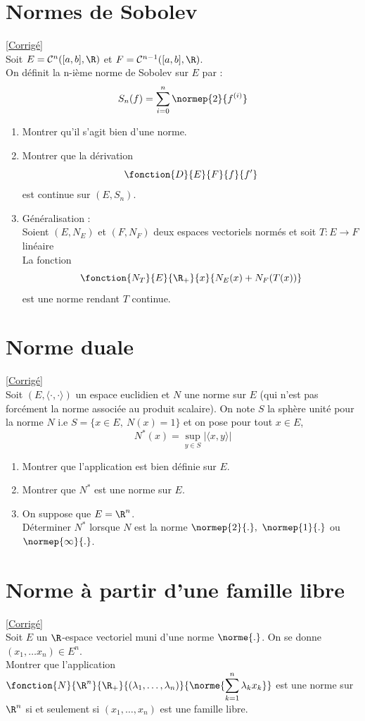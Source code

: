 \documentclass{book}
\begin{document}
	\section{Normes de Sobolev}
	\textcolor{blue}{\hyperref[sec:normes-de-sobolev]{[Corrigé]}}\\
	\label{Normes de Sobolev}
	Soit $E=\mathcal{C}^n([a,b],\R)$ et $F=\mathcal{C}^{n-1}([a,b],\R)$.\\
	On définit la n-ième norme de Sobolev sur $E$ par : \[S_n(f)=\sum_{i=0}^{n}\normep{2}{f^{(i)}}\]
	\begin{enumerate}
		\item Montrer qu'il s'agit bien d'une norme.
		\item Montrer que la dérivation \[\fonction{D}{E}{F}{f}{f'}\] est continue sur $(E,S_n)$.
		\item Généralisation : \\Soient $(E,N_E)$ et $(F,N_F)$ deux espaces vectoriels normés et soit $T:E\to F$ linéaire\\
		La fonction \[\fonction{N_T}{E}{\R_+}{x}{N_E(x)+N_F(T(x))}\]
		est une norme rendant $T$ continue.
	\end{enumerate}
	
	\section{Norme duale}
	\textcolor{blue}{\hyperref[sec:norme-duale]{[Corrigé]}}\\
	\label{Norme duale}
	Soit $(E,\langle\cdot,\cdot\rangle)$ un espace euclidien et $N$ une norme sur $E$ (qui n'est pas forcément la norme associée au produit scalaire). On note $S$ la sphère unité pour la norme $N$ i.e $S=\{x\in E,\ N(x)=1\}$ et on pose pour tout $x\in E$,
	$$N^*(x)=\sup_{y\in S}|\langle x,y\rangle|$$
	\begin{enumerate}
		\item Montrer que l'application est bien définie sur $E$.
		\item Montrer que $N^*$ est une norme sur $E$.
		\item On suppose que $E=\R^n$.\\
		Déterminer $N^*$ lorsque $N$ est la norme $\normep{2}{.},\ \normep{1}{.}$ ou $\normep{\infty}{.}$.
	\end{enumerate}
	
	\section{Norme à partir d'une famille libre}
	\textcolor{blue}{\hyperref[sec:norme-a-partir-dune-famille-libre]{[Corrigé]}}\\
	\label{Norme à partir d'une famille libre}
	Soit $E$ un $\R$-espace vectoriel muni d'une norme $\norme{.}$. On se donne $(x_1,\dots x_n)\in E^n$. 
	\\Montrer que l'application $\displaystyle \fonction{N}{\R^n}{\R_+}{(\lambda_1,\dots,\lambda_n)}{\displaystyle\norme{\sum_{k=1}^n\lambda_kx_k}}$ est une norme sur $\R^n$ si et seulement si $(x_1,\dots,x_n)$ est une famille libre.
	
\end{document}
